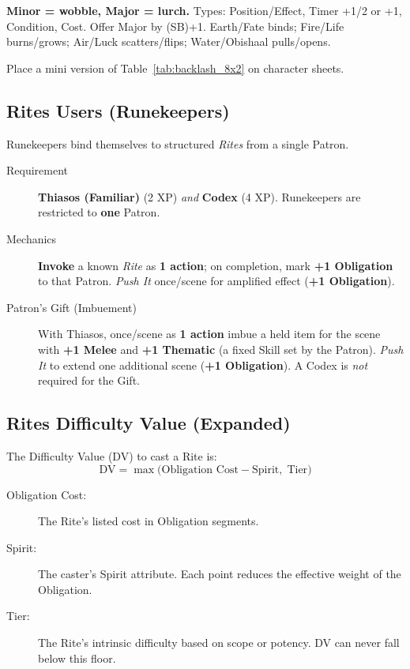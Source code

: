 \begin{tcolorbox}[title={Backlash Cheatsheet},colback=gray!5,colframe=black]
\textbf{Minor = wobble, Major = lurch.} Types: Position/Effect, Timer +1/2 or +1, Condition, Cost. Offer Major by (SB)+1. Earth/Fate binds; Fire/Life burns/grows; Air/Luck scatters/flips; Water/Obishaal pulls/opens.\par\smallskip
Place a mini version of Table~\ref{tab:backlash_8x2} on character sheets.
\end{tcolorbox}

\subsection{Rites Users (Runekeepers)}\label{subsec:runekeepers}

Runekeepers bind themselves to structured \emph{Rites} from a single Patron.

\begin{description}
    \item[Requirement] \textbf{Thiasos (Familiar)} (2 XP) \emph{and} \textbf{Codex} (4 XP). Runekeepers are restricted to \textbf{one} Patron.
    \item[Mechanics] \textbf{Invoke} a known \emph{Rite} as \textbf{1 action}; on completion, mark \textbf{+1 Obligation} to that Patron. \emph{Push It} once/scene for amplified effect (\textbf{+1 Obligation}).
    \item[Patron's Gift (Imbuement)] With Thiasos, once/scene as \textbf{1 action} imbue a held item for the scene with \textbf{+1 Melee} and \textbf{+1 Thematic} (a fixed Skill set by the Patron). \emph{Push It} to extend one additional scene (\textbf{+1 Obligation}). A Codex is \emph{not} required for the Gift.
\end{description}

\subsection{Rites Difficulty Value (Expanded)}\label{sec:rites_dv_expanded}

The Difficulty Value (DV) to cast a Rite is:
\[
\text{DV} = \max\!\bigl(\text{Obligation Cost} - \text{Spirit},\; \text{Tier}\bigr)
\]

\begin{description}
    \item[Obligation Cost:] The Rite's listed cost in Obligation segments.
    \item[Spirit:] The caster's Spirit attribute. Each point reduces the effective weight of the Obligation.
    \item[Tier:] The Rite's intrinsic difficulty based on scope or potency. DV can never fall below this floor.
\end{description}

